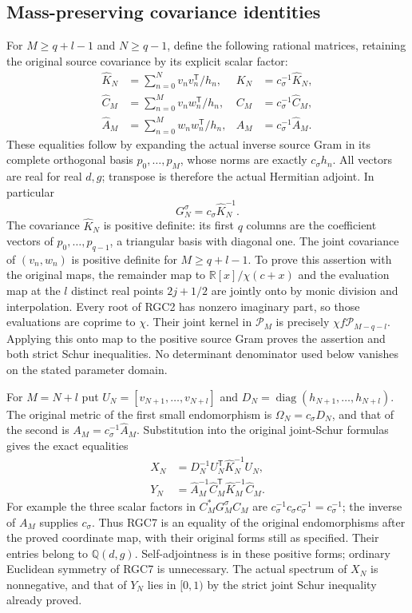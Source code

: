 \subsection{Mass-preserving covariance identities}
For $M\ge q+l-1$ and $N\ge q-1$, define the following rational
matrices, retaining the original source covariance by its explicit
scalar factor:
\begin{align}
 \widehat K_N&=\sum_{n=0}^N v_nv_n^{\mathsf T}/h_n,
 &K_N&=c_\sigma^{-1}\widehat K_N,\\
 \widehat C_M&=\sum_{n=0}^M v_nw_n^{\mathsf T}/h_n,
 &C_M&=c_\sigma^{-1}\widehat C_M,\\
 \widehat A_M&=\sum_{n=0}^M w_nw_n^{\mathsf T}/h_n,
 &A_M&=c_\sigma^{-1}\widehat A_M.\tag{RGC5}
\end{align}
These equalities follow by expanding the actual inverse source
Gram in its complete orthogonal basis $p_0,\ldots,p_M$, whose
norms are exactly $c_\sigma h_n$. All vectors are real for
real $d,g$; transpose is therefore the actual Hermitian adjoint.
In particular
\[
 G_N^\sigma=c_\sigma\widehat K_N^{-1}.\tag{RGC6}
\]
The covariance $\widehat K_N$ is positive definite: its first
$q$ columns are the coefficient vectors of $p_0,\ldots,p_{q-1}$,
a triangular basis with diagonal one. The joint covariance of
$(v_n,w_n)$ is positive definite for $M\ge q+l-1$.
To prove this assertion with the original maps, the remainder map
to $\mathbb R[x]/\chi(c+x)$ and the evaluation map at the $l$
distinct real points $2j+1/2$ are jointly onto by monic division
and interpolation. Every root of RGC2 has nonzero imaginary
part, so those evaluations are coprime to $\chi$. Their joint
kernel in $\mathcal P_M$ is precisely $\chi f\mathcal P_{M-q-l}$.
Applying this onto map to the positive source Gram proves the
assertion and both strict Schur inequalities. No determinant
denominator used below vanishes on the stated parameter domain.

For $M=N+l$ put $U_N=[v_{N+1},\ldots,v_{N+l}]$ and
$D_N=\operatorname{diag}(h_{N+1},\ldots,h_{N+l})$.
The original metric of the first small endomorphism is
$\Omega_N=c_\sigma D_N$, and that of the second is
$A_M=c_\sigma^{-1}\widehat A_M$. Substitution into the original
joint-Schur formulas gives the exact equalities
\begin{align}
 X_N&=D_N^{-1}U_N^{\mathsf T}\widehat K_N^{-1}U_N,\\
 Y_N&=\widehat A_M^{-1}\widehat C_M^{\mathsf T}
            \widehat K_M^{-1}\widehat C_M.\tag{RGC7}
\end{align}
For example the three scalar factors in
$C_M^*G_M^\sigma C_M$ are
$c_\sigma^{-1}c_\sigma c_\sigma^{-1}=c_\sigma^{-1}$;
the inverse of $A_M$ supplies $c_\sigma$.
Thus RGC7 is an equality of the original endomorphisms after
the proved coordinate map, with their original forms still as
specified. Their entries belong to $\mathbb Q(d,g)$.
Self-adjointness is in these positive forms; ordinary Euclidean
symmetry of RGC7 is unnecessary. The actual spectrum of $X_N$
is nonnegative, and that of $Y_N$ lies in $[0,1)$ by the strict
joint Schur inequality already proved.

